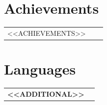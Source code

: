\documentclass[a4paper,10pt]{article}
\begin{document}
\section*{Achievements}

\begin{tabular}{@{} p{8.2cm} >{\centering\arraybackslash}p{7.0cm} >{\raggedleft\arraybackslash}p{2.5cm} @{} }
<<ACHIEVEMENTS>>
\end{tabular}

\section*{Languages}

\begin{tabular}{@{} >{\bfseries}p{3.8cm} p{13cm} @{} }
<<ADDITIONAL>>
\end{tabular}
\end{document}
